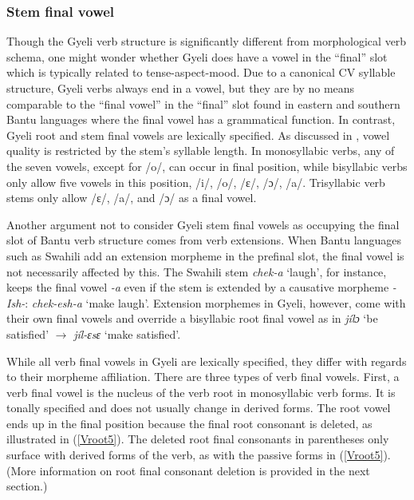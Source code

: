 \subsubsection{Stem final vowel} 
\label{sec:StemFinalV}

Though the Gyeli verb structure is significantly different from  morphological verb schema, one might wonder whether Gyeli does have a vowel in the ``final'' slot which is typically related to tense-aspect-mood. 
Due to a canonical CV syllable structure, Gyeli verbs always end in a vowel, but they are by no means comparable to the ``final vowel'' in the ``final'' slot found in eastern and southern Bantu languages where the final vowel has a grammatical function. In contrast, Gyeli root and stem final vowels are lexically specified.  As discussed in , vowel quality is restricted by the stem's syllable length. In monosyllabic verbs, any of the seven vowels, except for /o/, can occur in final position, while bisyllabic verbs only allow five vowels in this position, /i/, /o/, /ɛ/, /ɔ/, /a/. Trisyllabic verb stems only allow /ɛ/, /a/, and /ɔ/ as a final vowel.

Another argument not to consider Gyeli stem final vowels as occupying the final slot of  Bantu verb structure comes from verb extensions. When Bantu languages such as Swahili add an extension morpheme in the prefinal slot, the final vowel is not necessarily affected by this. The Swahili stem {\itshape chek-a} `laugh', for instance, keeps the final vowel {\itshape -a} even if the stem is extended by a causative morpheme {\itshape -Ish-}: {\itshape chek-esh-a} `make laugh'. Extension morphemes in Gyeli, however, come with their own final vowels and override a bisyllabic root final vowel  as in {\itshape jílɔ} `be satisfied' $\rightarrow$ {\itshape jíl-ɛsɛ} `make satisfied'.

While all verb final vowels in Gyeli are lexically specified, they differ with regards to their morpheme affiliation. There are three types of verb final vowels. First, a verb final vowel is the nucleus of the verb root in monosyllabic verb forms. It is tonally specified and does not usually change in derived forms. The root vowel ends up in the final position because the final root consonant is deleted, as illustrated in (\ref{Vroot5}). The deleted root final consonants in parentheses only surface with derived forms of the verb, as with the passive forms in (\ref{Vroot5}). (More information on root final consonant deletion is provided in the next section.) 

